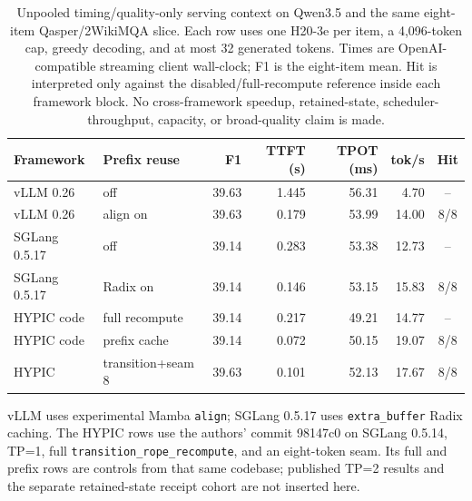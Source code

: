 \begin{table}[H]
\caption{Unpooled timing/quality-only serving context on Qwen3.5 and the same eight-item Qasper/2WikiMQA slice.  Each row uses one H20-3e per item, a 4,096-token cap, greedy decoding, and at most 32 generated tokens.  Times are OpenAI-compatible streaming client wall-clock; F1 is the eight-item mean.  Hit is interpreted only against the disabled/full-recompute reference inside each framework block.  No cross-framework speedup, retained-state, scheduler-throughput, capacity, or broad-quality claim is made.}
\label{tab:serving-controls}
\centering\scriptsize
\setlength{\tabcolsep}{4.0pt}
\begin{tabular}{@{}llrrrrc@{}}
\toprule
Framework & Prefix reuse & F1 & TTFT (s) & TPOT (ms) & tok/s & Hit \\
\midrule
vLLM 0.26 & off & 39.63 & 1.445 & 56.31 & 4.70 & -- \\
vLLM 0.26 & align on & 39.63 & 0.179 & 53.99 & 14.00 & 8/8 \\
\midrule
SGLang 0.5.17 & off & 39.14 & 0.283 & 53.38 & 12.73 & -- \\
SGLang 0.5.17 & Radix on & 39.14 & 0.146 & 53.15 & 15.83 & 8/8 \\
\midrule
HYPIC code & full recompute & 39.14 & 0.217 & 49.21 & 14.77 & -- \\
HYPIC code & prefix cache & 39.14 & 0.072 & 50.15 & 19.07 & 8/8 \\
HYPIC & transition+seam 8 & 39.63 & 0.101 & 52.13 & 17.67 & 8/8 \\
\bottomrule
\end{tabular}
\vspace{0.4mm}
\parbox{0.97\textwidth}{\footnotesize vLLM uses experimental Mamba \texttt{align}; SGLang 0.5.17 uses \texttt{extra\_buffer} Radix caching.  The HYPIC rows use the authors' commit 98147c0 on SGLang 0.5.14, TP=1, full \texttt{transition\_rope\_recompute}, and an eight-token seam.  Its full and prefix rows are controls from that same codebase; published TP=2 results and the separate retained-state receipt cohort are not inserted here.}
\end{table}
